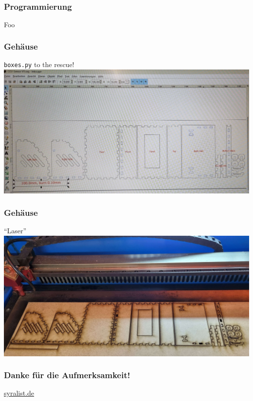 \documentclass[aspectratio=169,svgnames]{beamer}
\begin{document}
\begin{frame}
    \frametitle{Programmierung}
    Foo
\end{frame}

\begin{frame}
    \frametitle{Gehäuse}
    \texttt{boxes.py} to the rescue!\\
    \includegraphics[height=0.8\textheight]{boxes-py-02.jpg}
\end{frame}

\begin{frame}
    \frametitle{Gehäuse}
    \enquote{Laser}\\
    \includegraphics[height=0.8\textheight]{laser-02.jpg}
\end{frame}

\begin{frame}
    \frametitle{Danke für die Aufmerksamkeit!}
    \href{https:\\syralist.de}{syralist.de}
\end{frame}
\end{document}
